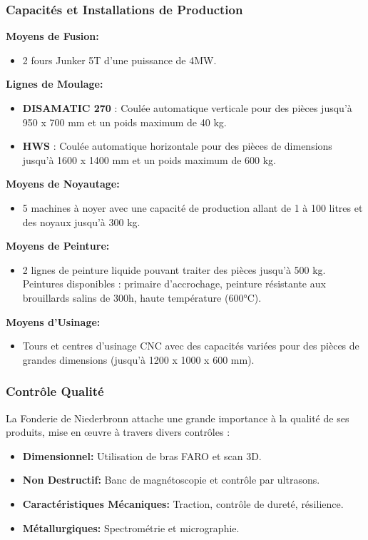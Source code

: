 \documentclass[12pt]{article}
\begin{document}
\subsubsection*{Capacités et Installations de Production}
\textbf{Moyens de Fusion:}
\begin{itemize}
    \item 2 fours Junker 5T d'une puissance de 4MW.
\end{itemize}

\textbf{Lignes de Moulage:}
\begin{itemize}
    \item \textbf{DISAMATIC 270} : Coulée automatique verticale pour des pièces jusqu'à 950 x 700 mm et un poids maximum de 40 kg.
    \item \textbf{HWS} : Coulée automatique horizontale pour des pièces de dimensions jusqu'à 1600 x 1400 mm et un poids maximum de 600 kg.
\end{itemize}

\textbf{Moyens de Noyautage:}
\begin{itemize}
    \item 5 machines à noyer avec une capacité de production allant de 1 à 100 litres et des noyaux jusqu'à 300 kg.
\end{itemize}

\textbf{Moyens de Peinture:}
\begin{itemize}
    \item 2 lignes de peinture liquide pouvant traiter des pièces jusqu'à 500 kg. Peintures disponibles : primaire d'accrochage, peinture résistante aux brouillards salins de 300h, haute température (600°C).
\end{itemize}

\textbf{Moyens d'Usinage:}
\begin{itemize}
    \item Tours et centres d'usinage CNC avec des capacités variées pour des pièces de grandes dimensions (jusqu'à 1200 x 1000 x 600 mm).
\end{itemize}

\subsubsection*{Contrôle Qualité}
La Fonderie de Niederbronn attache une grande importance à la qualité de ses produits, mise en œuvre à travers divers contrôles :
\begin{itemize}
    \item \textbf{Dimensionnel:} Utilisation de bras FARO et scan 3D.
    \item \textbf{Non Destructif:} Banc de magnétoscopie et contrôle par ultrasons.
    \item \textbf{Caractéristiques Mécaniques:} Traction, contrôle de dureté, résilience.
    \item \textbf{Métallurgiques:} Spectrométrie et micrographie.
\end{itemize}
\end{document}

